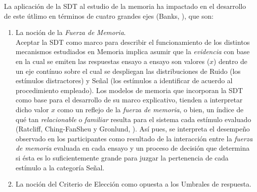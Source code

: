 La aplicación de la SDT al estudio de la memoria ha impactado en el desarrollo de este útlimo en términos de cuatro grandes ejes (Banks, \citeyear{Banks1970}), que son:\\

\begin{enumerate}
\item La noción de la \textit{Fuerza de Memoria}.\\

Aceptar la SDT como marco para describir el funcionamiento de los distintos mecanismos estudiados en Memoria implica asumir que la \textit{evidencia} con base en la cual se emiten las respuestas ensayo a ensayo son valores ($x$) dentro de un eje contínuo sobre el cual se despliegan las distribuciones de Ruido (los estímulos distractores) y Señal (los estímulos a identificar de acuerdo al procedimiento empleado). Los modelos de memoria que incorporan la SDT como base para el desarrollo de su marco explicativo, tienden a interpretar dicho valor $x$ como un reflejo de la \textit{fuerza de memoria}, o bien, un índice de qué tan \textit{relacionable} o \textit{familiar} resulta para el sistema cada estímulo evaluado (Ratcliff, Ching-FanSheu y Gronlund, \citeyear{Ratcliff1992}). Así pues, se interpreta el desempeño observado en los participantes como resultado de la interacción entre la \textit{fuerza de memoria} evaluada en cada ensayo y un proceso de decisión que determina si ésta es lo suficientemente grande para juzgar la pertenencia de cada estímulo a la categoría Señal.\\


\item La noción del Criterio de Elección como opuesta a los Umbrales de respuesta.\\


\end{enumerate}
